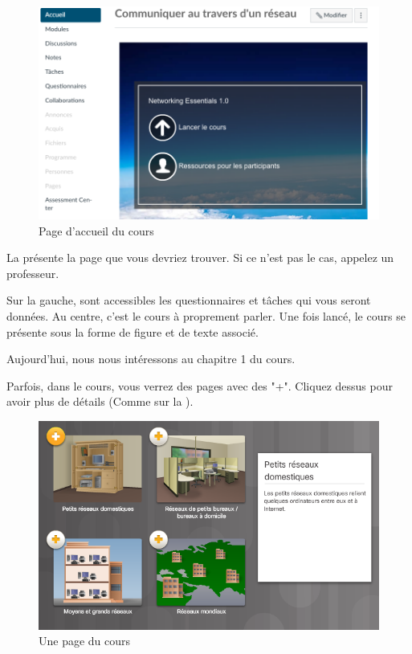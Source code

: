 \documentclass[11pt]{article}
\begin{document}
	\begin{figure}[ht]
		\centering
		\includegraphics[width=.6\textwidth]{Src/Images/page}
		\caption{Page d'accueil du cours}
		\label{fig:page}
	\end{figure}

	La  présente la page que vous devriez trouver. Si ce n'est pas le cas, appelez un professeur.

	Sur la gauche, sont accessibles les questionnaires et tâches qui vous seront données. Au centre, c'est le cours à proprement parler. Une fois lancé, le cours se présente sous la forme de figure et de texte associé.


	Aujourd'hui, nous nous intéressons au chapitre 1 du cours.

	Parfois, dans le cours, vous verrez des pages avec des "+". Cliquez dessus pour avoir plus de détails (Comme sur la ).

\begin{figure}[h]
	\centering
	\includegraphics[height=.3\textheight]{Src/Images/croix}
	\caption{Une page du cours}
	\label{fig:coursEx}
\end{figure}
\end{document}
